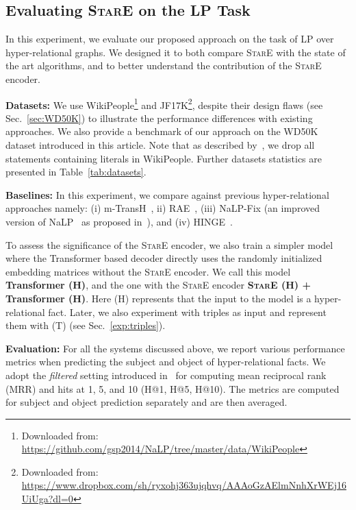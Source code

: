 \documentclass[11pt,a4paper]{article}
\begin{document}
\subsection{Evaluating \textsc{StarE} on the LP Task}
\label{sec:exp:1}





In this experiment, we evaluate our proposed approach on the task of LP over hyper-relational graphs. We designed it to both compare \textsc{StarE} with the state of the art algorithms, and to better understand the contribution of the \textsc{StarE} encoder.



\textbf{Datasets:} 
We use WikiPeople\footnote{Downloaded from: \url{https://github.com/gsp2014/NaLP/tree/master/data/WikiPeople}} and JF17K\footnote{Downloaded from: \url{https://www.dropbox.com/sh/ryxohj363ujqhvq/AAAoGzAElmNnhXrWEj16UiUga?dl=0}}, despite their design flaws (see Sec.~\ref{sec:WD50K}) to illustrate the performance differences with existing approaches.
We also provide a benchmark of our approach on the WD50K dataset introduced in this article.
Note that as described by~\cite{10.1145/3366423.3380257}, we drop all statements containing literals in WikiPeople. 
Further datasets statistics are presented in Table~\ref{tab:datasets}.

\textbf{Baselines:}
In this experiment, we compare against previous hyper-relational approaches namely: (i) m-TransH~\citep{DBLP:conf/ijcai/WenLMCZ16}, ii) RAE~\citep{DBLP:conf/www/ZhangLMM18}, (iii) NaLP-Fix (an improved version of NaLP~\citep{DBLP:conf/www/GuanJWC19} as proposed in~\citep{10.1145/3366423.3380257}), and (iv) HINGE~\citep{10.1145/3366423.3380257}.

To assess the significance of the \textsc{StarE} encoder, we also train a simpler model where the Transformer based decoder directly uses the randomly initialized embedding matrices without the \textsc{StarE} encoder.
We call this model \textbf{Transformer (H)}, and the one with the \textsc{StarE} encoder \textbf{\textsc{StarE} (H) + Transformer (H)}. Here (H) represents that the input to the model is a hyper-relational fact. Later, we also experiment with triples as input and represent them with (T) (see Sec.~\ref{exp:triples}).

\textbf{Evaluation:} For all the systems discussed above, we report various performance metrics when predicting the subject and object of hyper-relational facts.
We adopt the \emph{filtered} setting introduced in~\citep{DBLP:conf/nips/BordesUGWY13} for computing mean reciprocal rank (MRR) and hits at 1, 5, and 10 (H@1, H@5, H@10). 
The metrics are computed for subject and object prediction separately and are then averaged. 
\end{document}
